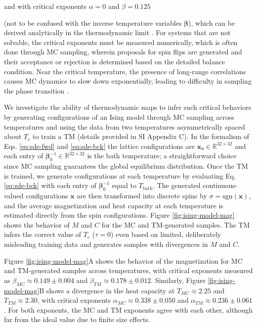 \documentclass[9pt,twocolumn,twoside]{pnas-new}
\begin{document}
and with critical exponents $\alpha=0$ and $\beta=0.125$ {(not to be confused with the inverse temperature variables $\bm{\beta}$), which can be derived analytically in the thermodynamic limit \cite{ising-crit-exp}. For systems that are not solvable, the critical exponents must be measured numerically, which is often done through MC sampling, wherein proposals for spin flips are generated and their acceptance or rejection is determined based on the detailed balance condition. Near the critical temperature, the presence of long-range correlations causes MC dynamics to slow down exponentially, leading to difficulty in sampling the phase transition \cite{wolff-critical-slow-down}.

We investigate the ability of thermodynamic maps to infer such critical behaviors by generating configurations of an Ising model through MC sampling across temperatures and using the data from two temperatures asymmetrically spaced about $T_c$ to train a TM (details provided in SI Appendix C). In the formalism of Eqs. \ref{eq:sde-fwd} and \ref{eq:sde-bck} the lattice configurations are $\mathbf{x}_0 \in \mathbb{R}^{32\times32}$ and each entry of $\bm{\beta}_0^{-1} \in \mathbb{R}^{32\times32}$ is the bath temperature; a straightforward choice since MC sampling guarantees the global equilibrium distribution. Once the TM is trained, we generate configurations at each temperature by evaluating Eq. \ref{eq:sde-bck} with each entry of $\bm{\beta}_0^{-1}$ equal to $T_{\mathrm{bath}}$. The generated continuous-valued configurations $\mathbf{x}$ are then transformed into discrete spins by $\sigma = \mathrm{sgn}(\mathbf{x})$, and the average magnetization and heat capacity at each temperature is estimated directly from the spin configurations. Figure \ref{fig:ising-model-mag} shows the behavior of $M$ and $C$ for the MC and TM-generated samples. The TM infers the correct value of $T_c$ ($\tau=0$) even based on limited, deliberately misleading training data and generates samples with divergences in $M$ and $C$. 

Figure \ref{fig:ising-model-mag}A shows the behavior of the magnetization for MC and TM-generated samples across temperatures, with critical exponents measured as $\beta_{MC} \approx 0.149 \pm 0.004$ and $\beta_{TM} \approx 0.178 \pm 0.012$. Similarly, Figure \ref{fig:ising-model-mag}B shows a divergence in the heat capacity at $T_{MC}\approx2.25$ and $T_{TM}\approx2.30$, with critical exponents $\alpha_{MC} \approx 0.338 \pm 0.050$ and $\alpha_{TM} \approx 0.236 \pm 0.061$. For both exponents, the MC and TM exponents agree with each other, although far from the ideal value due to finite size effects.

}
\end{document}
